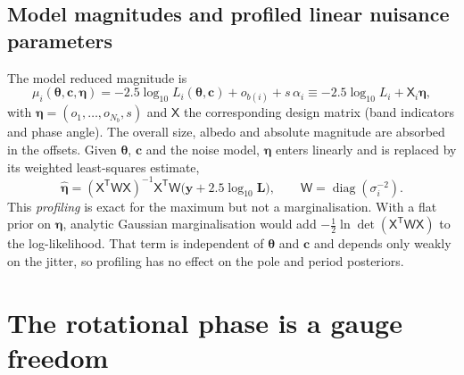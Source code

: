 \documentclass[11pt,a4paper]{article}
\theoremstyle{remark}
\newcommand{\vect}[1]{\bm{#1}}
\newcommand{\T}{^{\mathsf T}}
\DeclareMathOperator{\diag}{diag}
\begin{document}
\subsection{Model magnitudes and profiled linear nuisance parameters}
The model reduced magnitude is
\begin{equation}
  \mu_i(\vect\theta,\vect c,\vect\eta) = -2.5\log_{10}L_i(\vect\theta,\vect c) + o_{b(i)} + s\,\alpha_i
  \equiv -2.5\log_{10}L_i + \mathsf X_i\vect\eta,
  \label{eq:modelmag}
\end{equation}
with $\vect\eta=(o_1,\dots,o_{N_b},s)$ and $\mathsf X$ the corresponding design matrix (band
indicators and phase angle). The overall size, albedo and absolute magnitude are absorbed in the
offsets. Given $\vect\theta$, $\vect c$ and the noise model, $\vect\eta$ enters linearly and is
replaced by its weighted least-squares estimate,
\begin{equation}
  \hat{\vect\eta} = (\mathsf X\T\mathsf W\mathsf X)^{-1}\mathsf X\T\mathsf W\bigl(\vect y+2.5\log_{10}\vect L\bigr),\qquad
  \mathsf W=\diag(\sigma_i^{-2}).
  \label{eq:profile}
\end{equation}
This \emph{profiling} is exact for the maximum but not a marginalisation. With a flat prior on
$\vect\eta$, analytic Gaussian marginalisation would add $-\tfrac12\ln\det(\mathsf X\T\mathsf W\mathsf X)$
to the log-likelihood. That term is independent of $\vect\theta$ and $\vect c$ and depends only weakly
on the jitter, so profiling has no effect on the pole and period posteriors.

\section{The rotational phase is a gauge freedom}
\label{sec:gauge}
\end{document}
